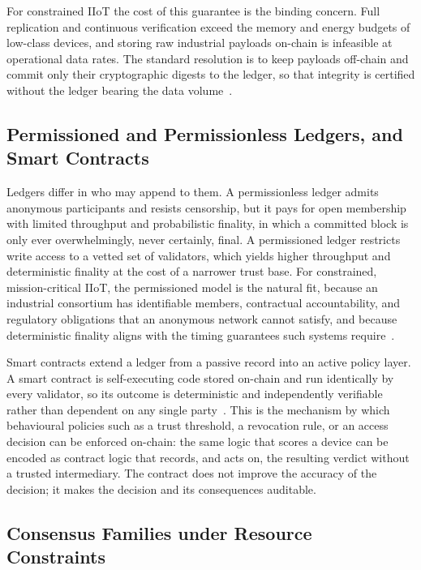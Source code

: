 For constrained IIoT the cost of this guarantee is the binding concern. Full
replication and continuous verification exceed the memory and energy budgets of
low-class devices, and storing raw industrial payloads on-chain is infeasible at
operational data rates. The standard resolution is to keep payloads off-chain
and commit only their cryptographic digests to the ledger, so that integrity is
certified without the ledger bearing the data volume~\cite{eren2025security}.

\subsection{Permissioned and Permissionless Ledgers, and Smart Contracts}
\label{subsec:permissioned-contracts}

Ledgers differ in who may append to them. A permissionless ledger admits
anonymous participants and resists censorship, but it pays for open membership
with limited throughput and probabilistic finality, in which a committed block is
only ever overwhelmingly, never certainly, final. A permissioned ledger restricts
write access to a vetted set of validators, which yields higher throughput and
deterministic finality at the cost of a narrower trust base. For constrained,
mission-critical IIoT, the permissioned model is the natural fit, because an
industrial consortium has identifiable members, contractual accountability, and
regulatory obligations that an anonymous network cannot satisfy, and because
deterministic finality aligns with the timing guarantees such systems
require~\cite{lahbib2024blockchain, bobde2024enhancing}.

Smart contracts extend a ledger from a passive record into an active policy
layer. A smart contract is self-executing code stored on-chain and run
identically by every validator, so its outcome is deterministic and
independently verifiable rather than dependent on any single
party~\cite{wu2024comprehensive, wei2024survey}. This is the mechanism by which
behavioural policies such as a trust threshold, a revocation rule, or an access
decision can be enforced on-chain: the same logic that scores a device can be
encoded as contract logic that records, and acts on, the resulting verdict
without a trusted intermediary. The contract does not improve the accuracy of
the decision; it makes the decision and its consequences auditable.

\subsection{Consensus Families under Resource Constraints}
\label{subsec:consensus-families}

